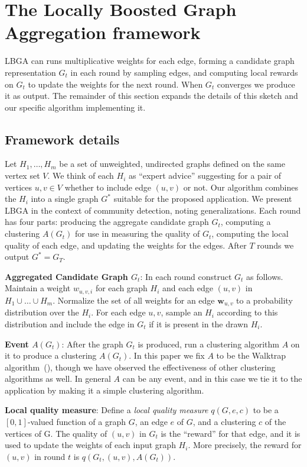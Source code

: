 \documentclass{article}
\begin{document}
\section{The Locally Boosted Graph Aggregation framework}
\label{sec:lbga}

LBGA can runs multiplicative weights for each edge, forming a candidate graph
representation $G_t$ in each round by sampling edges, and computing local
rewards on $G_t$ to update the weights for the next round. When $G_t$ converges
we produce it as output. The remainder of this section expands the details of
this sketch and our specific algorithm implementing it. 

\subsection{Framework details}
\label{sec:framework}

Let $H_1, \dots, H_m$ be a set of unweighted, undirected graphs defined on the
same vertex set $V$. We think of each $H_i$ as ``expert advice'' suggesting for
a pair of vertices $u,v \in V$ whether to include edge $(u,v)$ or not. Our
algorithm combines the $H_i$ into a single graph $G^*$ suitable for the
proposed application. We present LBGA in the context of community detection,
noting generalizations. Each round has four parts: producing the aggregate
candidate graph $G_t$, computing a clustering $A(G_t)$ for use in measuring the
quality of $G_t$, computing the local quality of each edge, and updating the
weights for the edges. After $T$ rounds we output $G^* = G_T$.

\textbf{Aggregated Candidate Graph $G_t$}: In each round construct $G_t$ as
follows. Maintain a weight $w_{u,v,i}$ for each graph $H_i$ and each edge
$(u,v)$ in $H_1 \cup \dots \cup H_m$. Normalize the set of all weights for an
edge $\mathbf{w}_{u,v}$ to a probability distribution over the $H_i$. For each
edge $u,v$, sample an $H_i$ according to this distribution and include the edge
in $G_t$ if it is present in the drawn $H_i$. 

\textbf{Event $A(G_t)$}: After the graph $G_t$ is produced, run a clustering
algorithm $A$ on it to produce a clustering $A(G_t)$. In this paper we fix $A$
to be the Walktrap algorithm~(\cite{Walktrap}), though we have observed the
effectiveness of other clustering algorithms as well. In general $A$ can be any
event, and in this case we tie it to the application by making it a simple
clustering algorithm.

\textbf{Local quality measure}: Define a \emph{local quality measure}
$q(G,e,c)$ to be a $[0,1]$-valued function of a graph $G$, an edge $e$ of $G$,
and a clustering $c$ of the vertices of G. The quality of $(u,v)$ in $G_t$ is
the ``reward'' for that edge, and it is used to update the weights of each
input graph $H_i$.  More precisely, the reward for $(u,v)$ in round $t$ is
$q(G_t, (u,v),A(G_t))$.
\end{document}
